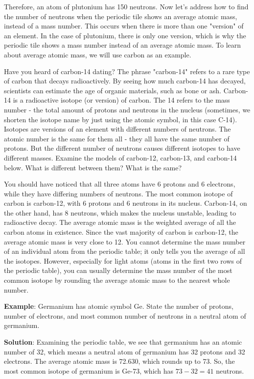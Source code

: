 Therefore, an atom of plutonium has 150 neutrons. Now let's address how to find
the number of neutrons when the periodic tile shows an average atomic mass,
instead of a mass number. This occurs when there is more than one "version" of
an element. In the case of plutonium, there is only one version, which is why
the periodic tile shows a mass number instead of an average atomic mass. To
learn about average atomic mass, we will use carbon as an example.

Have you heard of carbon-14 dating? The phrase "carbon-14" refers to a rare
type of carbon that decays radioactively. By seeing how much carbon-14 has
decayed, scientists can estimate the age of organic materials, such as bone or
ash. Carbon-14 is a radioactive isotope (or version) of carbon. The 14 refers to
the mass number - the total amount of protons and neutrons in the nucleus
(sometimes, we shorten the isotope name by just using the atomic symbol, in
this case C-14). Isotopes are versions of an element with different numbers of
neutrons. The atomic number is the same for them all - they all have the same
number of protons. But the different number of neutrons causes different
isotopes to have different masses. Examine the models of carbon-12, carbon-13,
and carbon-14 below. What is different between them? What is the same?



You should have noticed that all three atoms have 6 protons and 6 electrons,
while they have differing numbers of neutrons. The most common isotope of carbon
is carbon-12, with 6 protons and 6 neutrons in its nucleus. Carbon-14, on the
other hand, has 8 neutrons, which makes the nucleus unstable, leading to
radioactive decay. The average atomic mass
is the weighted average of all the carbon atoms in existence. Since the vast
majority of carbon is carbon-12, the average atomic mass is very close to 12.
You cannot determine the mass number of an individual atom from the periodic
table; it only tells you the average of all the isotopes. However, especially
for light atoms (atoms in the first two rows of the periodic table), you can
usually determine the mass number of the most common isotope by rounding the
average atomic mass to the nearest whole number.

\textbf{Example}: Germanium has atomic symbol Ge. State the number of protons,
number of electrons, and most common number of neutrons in a neutral atom of
germanium.

\textbf{Solution}: Examining the periodic table, we see that germanium has an
atomic number of 32, which means a neutral atom of germanium has 32 protons and
32 electrons. The average atomic mass is 72.630, which rounds up to 73. So, the
most common isotope of germanium is Ge-73, which has $73 - 32 = 41$ neutrons.

